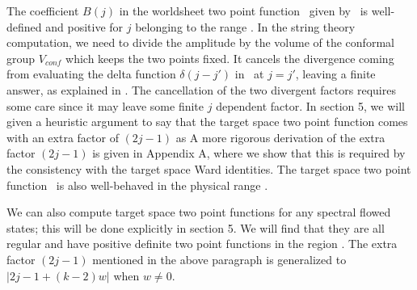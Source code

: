 The coefficient $B(j)$ in the worldsheet two point function
\teschnertwo\ given by  \
is well-defined and positive
for $j$ belonging to the range \range . In the string theory computation, we need to
divide the amplitude by the volume of the conformal group $V_{conf}$
which keeps the two points fixed. It cancels the divergence coming
from evaluating the delta function $\delta(j-j')$ in \teschnertwo\ at $j=j'$,
leaving a finite answer, as explained  in \ks .
The cancellation of the two divergent factors
requires some care since it
may leave some finite $j$ dependent factor.
In section 5, we will given a heuristic argument
to say that the target
space two point function comes with an extra factor of $(2j-1)$
as
\eqn{}
A more rigorous derivation of the extra factor $(2j-1)$
is given in Appendix A, where we show that this is required
by the consistency with the target space Ward identities.
The target space two point function \targetwo\
is also well-behaved in the physical range \range .

We can also compute target space two point functions for
any spectral flowed states; this will be done explicitly in
section 5.
We will find that they are all regular and have
positive definite two point functions in the region \range .
The extra factor $(2j-1)$ mentioned
in the above paragraph is generalized to
$|2j-1+(k-2)w|$ when $w\neq 0$.


